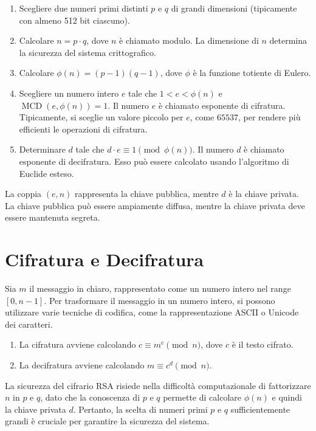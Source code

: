 \documentclass[a4paper,12pt]{report}
\begin{document}
\begin{enumerate}
    \item Scegliere due numeri primi distinti $p$ e $q$ di grandi dimensioni (tipicamente con almeno 512 bit ciascuno).
    \item Calcolare $n = p \cdot q$, dove $n$ è chiamato modulo. La dimensione di $n$ determina la sicurezza del sistema crittografico.
    \item Calcolare $\phi(n) = (p - 1)(q - 1)$, dove $\phi$ è la funzione totiente di Eulero.
    \item Scegliere un numero intero $e$ tale che $1 < e < \phi(n)$ e $\operatorname{MCD}(e, \phi(n)) = 1$. Il numero $e$ è chiamato esponente di cifratura. Tipicamente, si sceglie un valore piccolo per $e$, come $65537$, per rendere più efficienti le operazioni di cifratura.
    \item Determinare $d$ tale che $d \cdot e \equiv 1 \pmod{\phi(n)}$. Il numero $d$ è chiamato esponente di decifratura. Esso può essere calcolato usando l'algoritmo di Euclide esteso.
\end{enumerate}

La coppia $(e, n)$ rappresenta la chiave pubblica, mentre $d$ è la chiave privata. La chiave pubblica può essere ampiamente diffusa, mentre la chiave privata deve essere mantenuta segreta.

\section{Cifratura e Decifratura}
Sia $m$ il messaggio in chiaro, rappresentato come un numero intero nel range $[0, n - 1]$. Per trasformare il messaggio in un numero intero, si possono utilizzare varie tecniche di codifica, come la rappresentazione ASCII o Unicode dei caratteri.

\begin{enumerate}
    \item La cifratura avviene calcolando $c \equiv m^e \pmod{n}$, dove $c$ è il testo cifrato.
    \item La decifratura avviene calcolando $m \equiv c^d \pmod{n}$.
\end{enumerate}

La sicurezza del cifrario RSA risiede nella difficoltà computazionale di fattorizzare $n$ in $p$ e $q$, dato che la conoscenza di $p$ e $q$ permette di calcolare $\phi(n)$ e quindi la chiave privata $d$. Pertanto, la scelta di numeri primi $p$ e $q$ sufficientemente grandi è cruciale per garantire la sicurezza del sistema.
\end{document}
